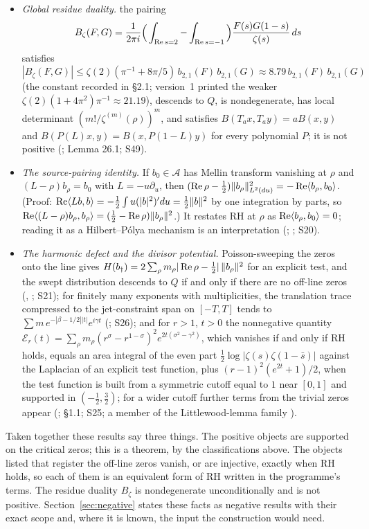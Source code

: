 \begin{itemize}
\item \emph{Global residue duality.} the pairing
\[
B_\zeta(F,G)=\frac1{2\pi i}\Big(\int_{\operatorname{Re} s=2}-\int_{\operatorname{Re} s=-1}\Big)\frac{F(s)G(1-s)}{\zeta(s)}\,ds
\]
satisfies $|B_\zeta(F,G)|\le\zeta(2)(\pi^{-1}+8\pi/5)\,b_{2,1}(F)\,b_{2,1}(G)\approx8.79\,b_{2,1}(F)\,b_{2,1}(G)$ (the constant recorded in  §2.1; version~1 printed the weaker $\zeta(2)(1+4\pi^2)\pi^{-1}\approx21.19$), descends to $Q$, is nondegenerate, has local determinant $(m!/\zeta^{(m)}(\rho))^m$, and satisfies $B(T_ax,T_ay)=aB(x,y)$ and $B(P(L)x,y)=B(x,P(1-L)y)$ for every polynomial $P$; it is not positive (;  Lemma 26.1; S49).
\item \emph{The source-pairing identity.} If $b_0\in\mathcal{A}$ has Mellin transform vanishing at $\rho$ and $(L-\rho)b_\rho=b_0$ with $L=-u\partial_u$, then $(\operatorname{Re}\rho-\tfrac12)\|b_\rho\|^2_{L^2(du)}=-\operatorname{Re}\langle b_\rho,b_0\rangle$. (Proof: $\operatorname{Re}\langle Lb,b\rangle=-\tfrac12\int u(|b|^2)'du=\tfrac12\|b\|^2$ by one integration by parts, so $\operatorname{Re}\langle(L-\rho)b_\rho,b_\rho\rangle=(\tfrac12-\operatorname{Re}\rho)\|b_\rho\|^2$.) It restates RH at $\rho$ as $\operatorname{Re}\langle b_\rho,b_0\rangle=0$; reading it as a Hilbert--Pólya mechanism is an interpretation (; ; S20).
\item \emph{The harmonic defect and the divisor potential.} Poisson-sweeping the zeros onto the line gives $H(b_\dagger)=2\sum_\rho m_\rho|\operatorname{Re}\rho-\tfrac12|\,\|b_\rho\|^2$ for an explicit test, and the swept distribution descends to $Q$ if and only if there are no off-line zeros (, ; S21); for finitely many exponents with multiplicities, the translation trace compressed to the jet-constraint span on $[-T,T]$ tends to $\sum m\,e^{-|\beta-1/2||t|}e^{i\gamma t}$ (; S26); and for $r>1$, $t>0$ the nonnegative quantity $\mathcal{E}_r(t)=\sum_\rho m_\rho(r^\sigma-r^{1-\sigma})^2e^{2t(\sigma^2-\gamma^2)}$, which vanishes if and only if RH holds, equals an area integral of the even part $\tfrac12\log|\zeta(s)\zeta(1-\bar s)|$ against the Laplacian of an explicit test function, plus $(r-1)^2(e^{2t}+1)/2$, when the test function is built from a symmetric cutoff equal to $1$ near $[0,1]$ and supported in $(-\tfrac12,\tfrac32)$; for a wider cutoff further terms from the trivial zeros appear (;  §1.1; S25; a member of the Littlewood-lemma family \cite{BalazardSaiasYor,SekatskiiBeltraminelliMerlini}).
\end{itemize}
Taken together these results say three things. The positive objects are supported on the critical zeros; this is a theorem, by the classifications above. The objects listed that register the off-line zeros vanish, or are injective, exactly when RH holds, so each of them is an equivalent form of RH written in the programme's terms. The residue duality $B_\zeta$ is nondegenerate unconditionally and is not positive. Section~\ref{sec:negative} states these facts as negative results with their exact scope and, where it is known, the input the construction would need.

